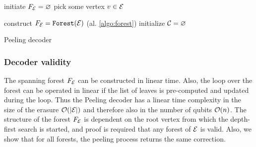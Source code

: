 \begin{algorithm}[h]
  \BlankLine
  \BlankLine
  initiate $F_{\mathcal{E}} = \varnothing$ \;
  pick some vertex $v \in \mathcal{E}$ \;
  \BlankLine
  \caption{}\label{algo:forest}
\end{algorithm}



\begin{algorithm}[h]
  \BlankLine
  \BlankLine
  construct $F_{\mathcal{E}} = \texttt{Forest}(\mathcal{E})$ (al. \ref{algo:forest})\;
  initialize $\mathcal{C} = {\varnothing}$\;
  \BlankLine
  \caption{Peeling decoder \cite{delfosse2017linear}}\label{algo:peel}
\end{algorithm}


\subsubsection{Decoder validity}
The spanning forest $F_{\mathcal{E}}$ can be constructed in linear time. Also, the loop over the forest can be operated in linear if the list of leaves is pre-computed and updated during the loop. Thus the Peeling decoder has a linear time complexity in the size of the erasure $\mathcal{O}(\abs{\mathcal{E}})$ and therefore also in the number of qubits $\mathcal{O}(n)$. The structure of the forest $F_{\mathcal{E}}$ is dependent on the root vertex from which the depth-first search is started, and proof is required that any forest of $\mathcal{E}$ is valid. Also, we show that for all forests, the peeling process returns the same correction.

